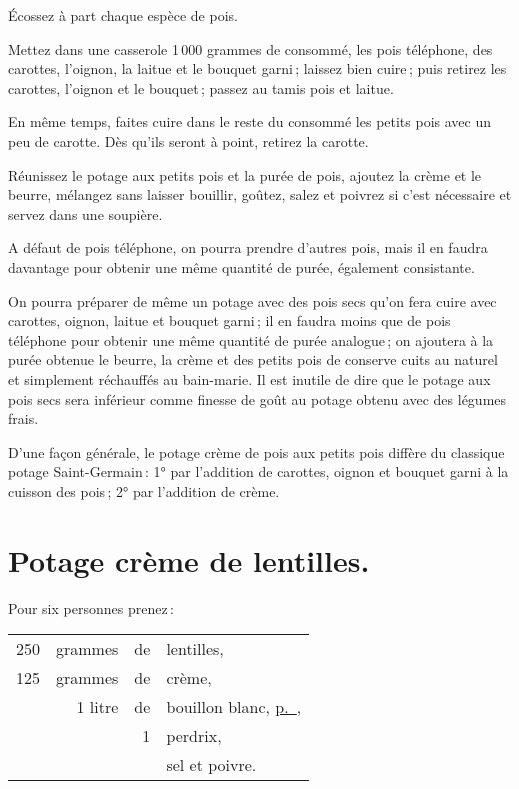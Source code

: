 Écossez à part chaque espèce de pois.

Mettez dans une casserole 1 000 grammes de consommé, les pois téléphone, des
carottes, l'oignon, la laitue et le bouquet garni ; laissez bien cuire ; puis
retirez les carottes, l'oignon et le bouquet ; passez au tamis pois et laitue.

En même temps, faites cuire dans le reste du consommé les petits pois avec un
peu de carotte. Dès qu'ils seront à point, retirez la carotte.

Réunissez le potage aux petits pois et la purée de pois, ajoutez la crème et le
beurre, mélangez sans laisser bouillir, goûtez, salez et poivrez si c'est
nécessaire et servez dans une soupière.

\sk

A défaut de pois téléphone, on pourra prendre d'autres pois, mais il en faudra
davantage pour obtenir une même quantité de purée, également consistante.

\sk

On pourra préparer de même un potage avec des pois secs qu'on fera cuire avec
carottes, oignon, laitue et bouquet garni ; il en faudra moins que de pois
téléphone pour obtenir une même quantité de purée analogue ; on ajoutera à la
purée obtenue le beurre, la crème et des petits pois de conserve cuits au
naturel et simplement réchauffés au bain-marie. Il est inutile de dire que le
potage aux pois secs sera inférieur comme finesse de goût au potage obtenu avec
des légumes frais.

\sk

D'une façon générale, le potage crème de pois aux petits pois diffère du
classique potage Saint-Germain : 1° par l'addition de carottes, oignon et
bouquet garni à la cuisson des pois ; 2° par l'addition de crème.

\section*{\centering Potage crème de lentilles.}

Pour six personnes prenez :

\medskip

\footnotesize
\begin{longtable}{rrrp{16em}}                                                    
    250 & grammes & de & lentilles,                                                                       \\
    125 & grammes & de & crème,                                                                           \\
        & 1 litre & de & bouillon blanc, \hyperlink{p0214}{p. \pageref{pg0214}},                          \\
        &         &  1 & perdrix,                                                                         \\
        &         &    & sel et poivre.                                                                   \\
\end{longtable}
\normalsize

